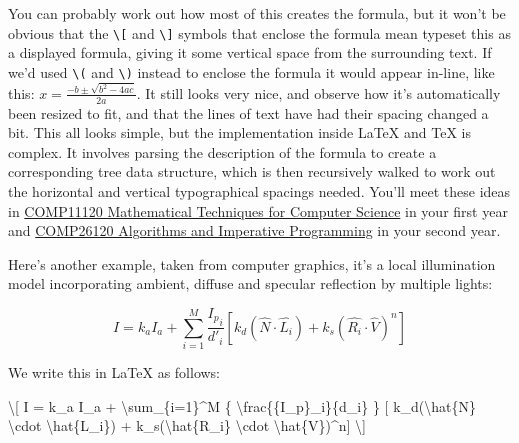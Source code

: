 \documentclass[
]{book}
\newenvironment{Shaded}{\begin{snugshade}}{\end{snugshade}}
\newcommand{\SpecialCharTok}[1]{\textcolor[rgb]{0.00,0.00,0.00}{#1}}
\newcommand{\SpecialStringTok}[1]{\textcolor[rgb]{0.31,0.60,0.02}{#1}}
\begin{document}
You can probably work out how most of this creates the formula, but it won't be obvious that the \texttt{\textbackslash{}{[}} and \texttt{\textbackslash{}{]}} symbols that enclose the formula mean typeset this as a displayed formula, giving it some vertical space from the surrounding text. If we'd used \texttt{\textbackslash{}(} and \texttt{\textbackslash{})} instead to enclose the formula it would appear in-line, like this: \(x = \frac{-b \pm \sqrt{b^2-4ac}}{2a}\). It still looks very nice, and observe how it's automatically been resized to fit, and that the lines of text have had their spacing changed a bit. This all looks simple, but the implementation inside LaTeX and TeX is complex. It involves parsing the description of the formula to create a corresponding tree data structure, which is then recursively walked to work out the horizontal and vertical typographical spacings needed. You'll meet these ideas in \href{https://studentnet.cs.manchester.ac.uk/ugt/COMP11120/syllabus/}{COMP11120 Mathematical Techniques for Computer Science} in your first year and \href{https://studentnet.cs.manchester.ac.uk/ugt/COMP26120/syllabus/}{COMP26120 Algorithms and Imperative Programming} in your second year.

Here's another example, taken from computer graphics, it's a local illumination model incorporating ambient, diffuse and specular reflection by multiple lights:

\[ I = k_a I_a + \sum_{i=1}^M {\frac{{I_p}_i}{d'_i}} [ k_d(\hat{N}\cdot\hat{L_i}) + k_s(\hat{R_i}\cdot\hat{V})^n] \]

We write this in LaTeX as follows:

\begin{Shaded}
\begin{Highlighting}[]
    \SpecialStringTok{\textbackslash{}[ I = k\_a I\_a + }\SpecialCharTok{\textbackslash{}sum}\SpecialStringTok{\_\{i=1\}\^{}M \{ }\SpecialCharTok{\textbackslash{}frac}\SpecialStringTok{\{\{I\_p\}\_i\}\{d\textquotesingle{}\_i\} \}}
\SpecialStringTok{    [ k\_d(}\SpecialCharTok{\textbackslash{}hat}\SpecialStringTok{\{N\} }\SpecialCharTok{\textbackslash{}cdot}\SpecialStringTok{ }\SpecialCharTok{\textbackslash{}hat}\SpecialStringTok{\{L\_i\})}
\SpecialStringTok{    + k\_s(}\SpecialCharTok{\textbackslash{}hat}\SpecialStringTok{\{R\_i\} }\SpecialCharTok{\textbackslash{}cdot}\SpecialStringTok{ }\SpecialCharTok{\textbackslash{}hat}\SpecialStringTok{\{V\})\^{}n] \textbackslash{}]}
\end{Highlighting}
\end{Shaded}
\end{document}
